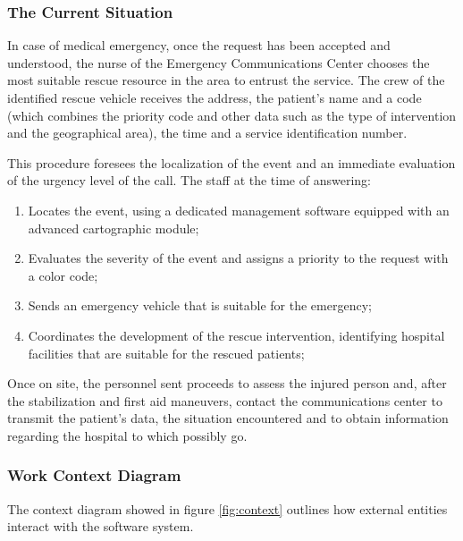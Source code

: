 \documentclass[11pt,a4paper]{article}
\begin{document}
\subsubsection{The Current Situation}
In case of medical emergency, once the request has been accepted and understood, the nurse of the Emergency Communications Center chooses the most suitable rescue resource in the area to entrust the service. 
%
The crew of the identified rescue vehicle receives the address, the patient's name and a code (which combines the priority code and other data such as the type of intervention and the geographical area), the time and a service identification number.

This procedure foresees the localization of the event and an immediate evaluation of the urgency level of the call. 
%
The staff at the time of answering: 

\begin{enumerate}
    \item Locates the event, using a dedicated management software equipped with an advanced cartographic module;
    \item Evaluates the severity of the event and assigns a priority to the request with a color code;
    \item Sends an emergency vehicle that is suitable for the emergency;
    \item Coordinates the development of the rescue intervention, identifying hospital facilities that are suitable for the rescued patients;
\end{enumerate}

Once on site, the personnel sent proceeds to assess the injured person and, after the stabilization and first aid maneuvers, contact the communications center to transmit the patient's data, the situation encountered and to obtain information regarding the hospital to which possibly go.

\subsubsection{Work Context Diagram}
The context diagram showed in figure \ref{fig:context} outlines how external entities interact with the software system.
\end{document}
